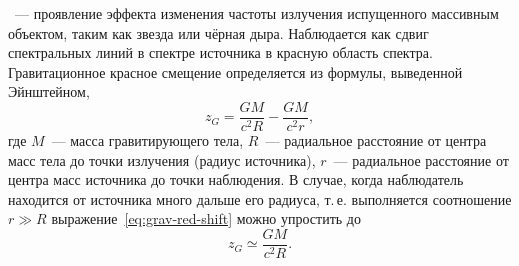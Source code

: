 ~--- проявление эффекта изменения частоты излучения испущенного массивным объектом, таким как звезда или чёрная дыра. Наблюдается как сдвиг спектральных линий в спектре источника в красную область спектра. Гравитационное красное смещение определяется из формулы, выведенной Эйнштейном,
\begin{equation}
z_G=\dfrac{GM}{c^2 R}-\dfrac{GM}{c^2 r},
\label{eq:grav-red-shift}
\end{equation}
где $M$~--- масса гравитирующего тела, $R$~--- радиальное расстояние от центра масс тела до точки излучения (радиус источника), $r$~---  радиальное расстояние от центра масс источника до точки наблюдения. В случае, когда наблюдатель находится от источника много дальше его радиуса, т.\,е. выполняется соотношение $r \gg R$ выражение~\eqref{eq:grav-red-shift} можно упростить до 
\begin{equation}
	z_G \simeq \dfrac{GM}{c^2 R}.
\end{equation}
